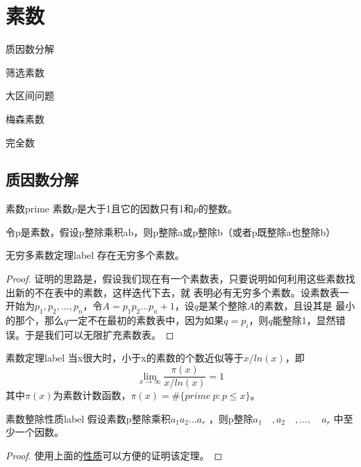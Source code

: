 \chapter{素数}
\begin{introduction}[本章内容提要]
	\item 质因数分解
	\item 筛选素数
	\item 大区间问题
	\item 梅森素数
	\item 完全数
\end{introduction}

\section{质因数分解}
\begin{definition}{素数}{prime}
	素数$p$是大于1且它的因数只有1和$p$的整数。
\end{definition}

\begin{property}
	\label{pro:prime}
	令p是素数，假设p整除乘积ab，则p整除a或p整除b（或者p既整除a也整除b）  
\end{property}

\begin{theorem}{无穷多素数定理}{label}
	存在无穷多个素数。
\end{theorem}

\begin{proof}
	证明的思路是，假设我们现在有一个素数表，只要说明如何利用这些素数找出新的不在表中的素数，这样迭代下去，就
表明必有无穷多个素数。设素数表一开始为$p_1,p_2,...,p_n$，令$A = p_1p_2...p_n + 1$，设$q$是某个整除$A$的素数，且设其是
最小的那个，那么$q$一定不在最初的素数表中，因为如果$q=p_i$，则$q$能整除1，显然错误。于是我们可以无限扩充素数表。
\end{proof}

\begin{theorem}{素数定理}{label}
	当x很大时，小于x的素数的个数近似等于$x/ln(x)$，即
	$$
	\lim_{x\to\infty} \frac{\pi(x)}{x/ln(x)}=1
	$$
	其中$\pi(x)$为素数计数函数，$\pi(x) = \#\{prime\ p:p\le x\}$。
\end{theorem}

\begin{theorem}{素数整除性质}{label}
假设素数p整除乘积$a_1a_2...a_r$ ，则p整除$a_1 \quad ,a_2 \quad , ...,\quad a_r$ 中至少一个因数。
\end{theorem}

\begin{proof}
	使用上面的\hyperref[pro:prime]{性质}可以方便的证明该定理。
\end{proof}

